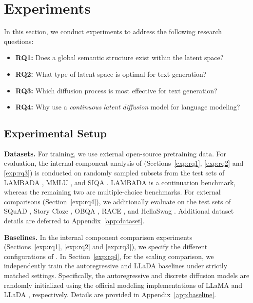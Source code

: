 \section{Experiments}

In this section, we conduct experiments to address the following research questions:

\begin{itemize}
    \item \textbf{RQ1: }Does a global semantic structure exist within the latent space?
    \item \textbf{RQ2: }What type of latent space is optimal for text generation?
    \item \textbf{RQ3: }Which diffusion process is most effective for text generation?
    \item \textbf{RQ4: }Why use a \emph{continuous} \emph{latent} \emph{diffusion} model for language modeling?
\end{itemize}

\subsection{Experimental Setup}

\textbf{Datasets. }
For training, we use external open-source pretraining data. For evaluation, the internal component analysis of \method (Sections~\ref{exp:rq1}, \ref{exp:rq2} and \ref{exp:rq3}) is conducted on randomly sampled subsets from the test sets of LAMBADA \citep{paperno2016lambada}, MMLU \citep{hendrycks2020measuring}, and SIQA \citep{sap2019social}. LAMBADA is a continuation benchmark, whereas the remaining two are multiple-choice benchmarks. For external comparisons (Section~\ref{exp:rq4}), we additionally evaluate on the test sets of SQuAD \citep{rajpurkar2016squad}, Story Cloze \citep{mostafazadeh2016corpus}, OBQA \citep{mihaylov2018can}, RACE \citep{lai2017race}, and HellaSwag \citep{zellers2019hellaswag}. Additional dataset details are deferred to Appendix~\ref{app:dataset}.

\textbf{Baselines. } 
In the internal component comparison experiments (Sections~\ref{exp:rq1}, \ref{exp:rq2} and \ref{exp:rq3}), we specify the different configurations of \method. In Section~\ref{exp:rq4}, for the scaling comparison, we independently train the autoregressive and LLaDA baselines under strictly matched settings. Specifically, the autoregressive and discrete diffusion models are randomly initialized using the official modeling implementations of LLaMA \citep{touvron2023llama} and LLaDA \citep{nie2025large}, respectively. Details are provided in Appendix~\ref{app:baseline}.

